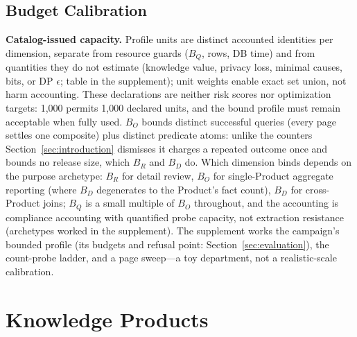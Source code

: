 \documentclass[10pt,journal,compsoc]{IEEEtran}
\begin{document}
\subsection{Budget Calibration}
\label{sec:calibration}

\textbf{Catalog-issued capacity.} Profile units are distinct accounted
identities per dimension, separate from resource guards ($B_Q$, rows, DB
time) and from quantities they do not estimate (knowledge value, privacy
loss, minimal causes, bits, or DP $\epsilon$; table in the supplement);
unit weights enable exact set union, not harm accounting. These
declarations are neither risk scores nor optimization targets:
1,000 permits 1,000 declared units, and the bound profile must remain acceptable
when fully used. $B_O$ bounds distinct successful queries (every page
settles one composite) plus distinct predicate atoms: unlike the counters
Section~\ref{sec:introduction} dismisses it charges a repeated outcome once
and bounds no release size, which $B_R$ and $B_D$ do. Which dimension binds
depends on the purpose archetype: $B_R$ for detail review, $B_O$ for
single-Product aggregate reporting (where $B_D$ degenerates to the
Product's fact count), $B_D$ for cross-Product joins; $B_Q$ is a small
multiple of $B_O$ throughout, and the accounting is compliance accounting
with quantified probe capacity, not extraction resistance (archetypes
worked in the supplement). The
supplement works the campaign's bounded profile (its budgets and refusal
point: Section~\ref{sec:evaluation}), the count-probe ladder, and a page
sweep---a toy department, not a realistic-scale calibration.

\section{Knowledge Products}
\label{sec:knowledge}
\end{document}
